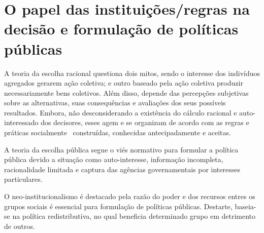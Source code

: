 \section{O papel das instituições/regras na decisão e formulação de políticas públicas}


A teoria da escolha racional questiona dois mitos, sendo o interesse dos indivíduos agregados gerarem ação coletiva; e outro baseado pela ação coletiva produzir necessariamente bens coletivos.
Além disso, depende das percepções subjetivas sobre as alternativas, suas consequências e avaliações dos seus possíveis resultados.
Embora, não desconsiderando a existência do cálculo racional e auto-interessado dos decisores, esses agem e se organizam de acordo com as regras e práticas socialmente  construídas, conhecidas antecipadamente e aceitas.

A teoria da escolha pública segue o viés normativo para formular a política pública devido a situação como auto-interesse, informação incompleta, racionalidade limitada e captura das agências governamentais por interesses particulares.

O neo-institucionalismo é destacado pela razão do poder e dos recursos entres os grupos sociais é essencial para formulação de políticas públicas.
Destarte, baseia-se na política redistributiva, no qual beneficia determinado grupo em detrimento de outros.
